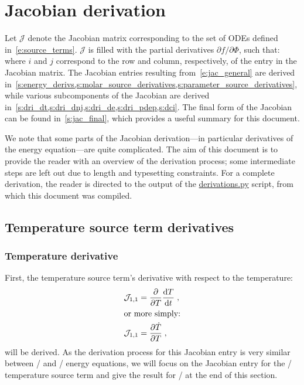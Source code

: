 \documentclass[12pt,number,sort&compress]{elsarticle}
\begin{document}
\section{Jacobian derivation}

Let $\mathcal{J}$ denote the Jacobian matrix corresponding to the set of ODEs defined in~\cref{e:source_terms}.
$\mathcal{J}$ is filled with the partial derivatives $\partial f / \partial \Phi$, such that:
where $i$ and $j$ correspond to the row and column, respectively, of the entry in the Jacobian matrix.
The Jacobian entries resulting from~\cref{e:jac_general} are derived in~\cref{s:energy_derivs,s:molar_source_derivatives,s:parameter_source_derivatives}, while various subcomponents of the Jacobian are derived in~\cref{s:dri_dt,s:dri_dnj,s:dri_de,s:dri_pdep,s:dci}.
The final form of the Jacobian can be found in~\cref{s:jac_final}, which provides a useful summary for this document.

We note that some parts of the Jacobian derivation---in particular derivatives of the energy equation---are quite complicated.
The aim of this document is to provide the reader with an overview of the derivation process; some intermediate steps are left out due to length and typesetting constraints.
For a complete derivation, the reader is directed to the output of the \href{https://github.com/arghdos/SPyJac-paper/blob/master/derivations/scripts/derivations.py}{derivations.py} script, from which this document was compiled.

\subsection{Temperature source term derivatives}
\label{s:energy_derivs}
\subsubsection{Temperature derivative}
\label{s:denergy_dt}
First, the temperature source term's derivative with respect to the temperature:
\begin{align}
 \mathcal{J}_{1,1} &= \frac{\partial}{\partial T} \frac{\text{d} T}{\text{d} t} \;, \nonumber \\
 \intertext{or more simply:}
 \label{e:dTdotdT_initial}
 \mathcal{J}_{1,1} &= \frac{\partial\dot{T}}{\partial{T}} \;,
\end{align}
will be derived.
As the derivation process for this Jacobian entry is very similar between \conp/ and \conv/ energy equations, we will focus on the Jacobian entry for the \conp/ temperature source term and give the result for \conv/ at the end of this section.
\end{document}
